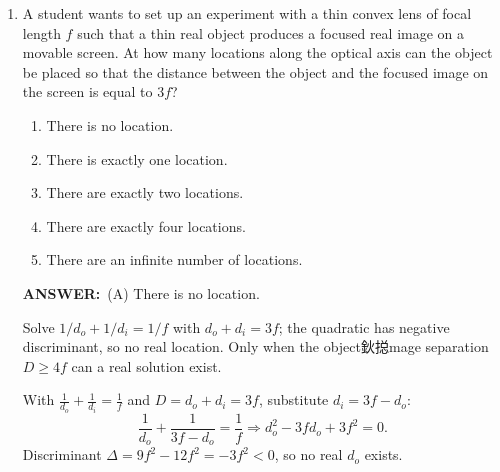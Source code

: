 ﻿\documentclass[12pt, a4paper]{article}
\makeatletter
\newcommand{\finalanswer}[1]{\textbf{ANSWER:}~#1}
\newif\if@categoryprinted
\newcommand{\category}[1]{\if@categoryprinted\relax\else\textit{\textcolor{gray}{Category: #1}}\global\@categoryprintedtrue\fi}
\newcommand{\tags}[1]{}
\makeatother
\begin{document}
\begin{CJK*}{UTF8}{gbsn}
\begin{enumerate}[itemsep=1.0em, topsep=0.6em]
\category{Rolling Energy} \tags{}
\begin{answerbox}
\finalanswer{(E) 50 J}
\end{answerbox}
\begin{insightbox}
With pure rolling $v=R\omega$, a solid sphere has $K_{rot}=\tfrac{1}{5}mv^2$, so $K_{trans}=(5/2)K_{rot}$.
\end{insightbox}
\begin{solutionbox}

For a solid sphere, $I=\tfrac{2}{5}mR^2$ and $v=R\omega$. Then $K_{rot}=\tfrac{1}{2}I\omega^2=\tfrac{1}{5}mv^2$. Meanwhile $K_{trans}=\tfrac{1}{2}mv^2=\tfrac{5}{2}K_{rot}=50\,\text{J}$.
\end{solutionbox}

\newpage

\item \label{prob:21}
A student wants to set up an experiment with a thin convex lens of focal length $f$ such that a thin real object produces a focused real image on a movable screen. At how many locations along the optical axis can the object be placed so that the distance between the object and the focused image on the screen is equal to $3f$?
\begin{enumerate}[label=(\Alph*)]
    \item There is no location.
    \item There is exactly one location.
    \item There are exactly two locations.
    \item There are exactly four locations.
    \item There are an infinite number of locations.
\end{enumerate}

\category{Geometric Optics}
\begin{answerbox}
\finalanswer{(A) There is no location.}
\end{answerbox}
\begin{insightbox}
Solve $1/d_o+1/d_i=1/f$ with $d_o+d_i=3f$; the quadratic has negative discriminant, so no real location. Only when the object鈥搃mage separation $D\ge 4f$ can a real solution exist.
\end{insightbox}
\begin{solutionbox}

With $\tfrac{1}{d_o}+\tfrac{1}{d_i}=\tfrac{1}{f}$ and $D=d_o+d_i=3f$, substitute $d_i=3f-d_o$:
\[
\frac{1}{d_o}+\frac{1}{3f-d_o}=\frac{1}{f} \Rightarrow d_o^2-3fd_o+3f^2=0.
\]
Discriminant $\Delta=9f^2-12f^2=-3f^2<0$, so no real $d_o$ exists.
\end{solutionbox}


\end{enumerate}
\end{CJK*}
\end{document}
